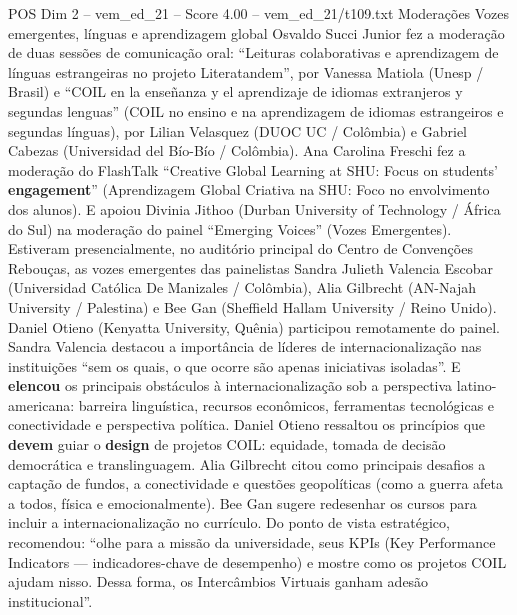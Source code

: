 \begin{textsample}{POS Dim 2 – vem\_ed\_21 – Score 4.00 – vem\_ed\_21/t109.txt}  \label{ex:f2_pos_169}
Moderações Vozes emergentes, línguas e aprendizagem global Osvaldo Succi Junior fez a moderação de duas sessões de comunicação oral: “Leituras colaborativas e aprendizagem de línguas estrangeiras no projeto Literatandem”, por Vanessa Matiola (Unesp / Brasil) e “COIL en la enseñanza y el aprendizaje de idiomas extranjeros y segundas lenguas” (COIL no ensino e na aprendizagem de idiomas estrangeiros e segundas línguas), por Lilian Velasquez (DUOC UC / Colômbia) e Gabriel Cabezas (Universidad del Bío-Bío / Colômbia).
Ana Carolina Freschi fez a moderação do FlashTalk “Creative Global Learning at SHU: Focus on students’ \textbf{engagement}” (Aprendizagem Global Criativa na SHU: Foco no envolvimento dos alunos).
E apoiou Divinia Jithoo (Durban University of Technology / África do Sul) na moderação do painel “Emerging Voices” (Vozes Emergentes).
Estiveram presencialmente, no auditório principal do Centro de Convenções Rebouças, as vozes emergentes das painelistas Sandra Julieth Valencia Escobar (Universidad Católica De Manizales / Colômbia), Alia Gilbrecht (AN-Najah University / Palestina) e Bee Gan (Sheffield Hallam University / Reino Unido).
Daniel Otieno (Kenyatta University, Quênia) participou remotamente do painel.
Sandra Valencia destacou a importância de líderes de internacionalização nas instituições “sem os quais, o que ocorre são apenas iniciativas isoladas”.
E \textbf{elencou} os principais obstáculos à internacionalização sob a perspectiva latino-americana: barreira linguística, recursos econômicos, ferramentas tecnológicas e conectividade e perspectiva política.
Daniel Otieno ressaltou os princípios que \textbf{devem} guiar o \textbf{design} de projetos COIL: equidade, tomada de decisão democrática e translinguagem.
Alia Gilbrecht citou como principais desafios a captação de fundos, a conectividade e questões geopolíticas (como a guerra afeta a todos, física e emocionalmente).
Bee Gan sugere redesenhar os cursos para incluir a internacionalização no currículo.
Do ponto de vista estratégico, recomendou: “olhe para a missão da universidade, seus KPIs (Key Performance Indicators — indicadores-chave de desempenho) e mostre como os projetos COIL ajudam nisso.
Dessa forma, os Intercâmbios Virtuais ganham adesão institucional”.

\end{textsample}
